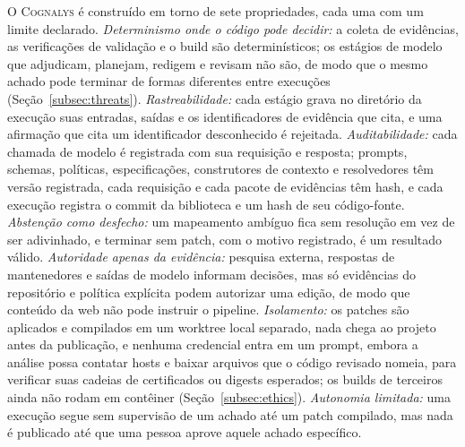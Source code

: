 \documentclass[conference]{IEEEtran}
\newcommand{\system}{\textsc{Cognalys}}
\begin{document}
O \system{} é construído em torno de sete propriedades, cada uma com um limite
declarado. \emph{Determinismo onde o código pode decidir:} a coleta de
evidências, as verificações de validação e o build são determinísticos; os
estágios de modelo que adjudicam, planejam, redigem e revisam não são, de modo
que o mesmo achado pode terminar de formas diferentes entre execuções
(Seção~\ref{subsec:threats}). \emph{Rastreabilidade:} cada estágio grava no
diretório da execução suas entradas, saídas e os identificadores de evidência
que cita, e uma afirmação que cita um identificador desconhecido é rejeitada.
\emph{Auditabilidade:} cada chamada de modelo é registrada com sua requisição
e resposta; prompts, schemas, políticas, especificações, construtores de
contexto e resolvedores têm versão registrada, cada requisição e cada pacote de
evidências têm hash, e cada execução registra o commit da biblioteca e um hash
de seu código-fonte. \emph{Abstenção como desfecho:} um mapeamento ambíguo
fica sem resolução em vez de ser adivinhado, e terminar sem patch, com o
motivo registrado, é um resultado válido. \emph{Autoridade apenas da
evidência:} pesquisa externa, respostas de mantenedores e saídas de modelo
informam decisões, mas só evidências do repositório e política explícita podem
autorizar uma edição, de modo que conteúdo da web não pode instruir o
pipeline. \emph{Isolamento:} os patches são aplicados e compilados em um
worktree local separado, nada chega ao projeto antes da publicação, e nenhuma
credencial entra em um prompt, embora a análise possa contatar hosts e
baixar arquivos que o código revisado nomeia, para verificar suas cadeias de
certificados ou digests esperados; os builds de terceiros ainda não rodam em
contêiner (Seção~\ref{subsec:ethics}). \emph{Autonomia limitada:} uma execução
segue sem supervisão de um achado até um patch compilado, mas nada é publicado
até que uma pessoa aprove aquele achado específico.
\end{document}

